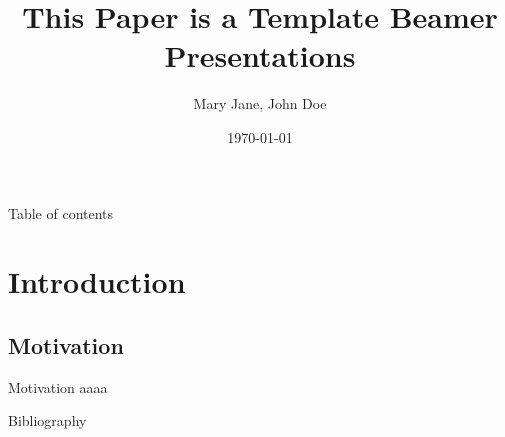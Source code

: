\documentclass{beamer}
\begin{document}
\title{This Paper is a Template Beamer Presentations}

\author[Abbrev]{Mary Jane, John Doe}


\date{\today}

\begin{frame}
\titlepage
\end{frame}

\begin{frame}{Table of contents}
\tableofcontents
\end{frame}

\section{Introduction}

\subsection{Motivation}

\begin{frame}{Motivation}
aaaa
\end{frame}

\begin{frame}{Bibliography}
\nocite{*}
\printbibliography
\end{frame}

\end{document}
